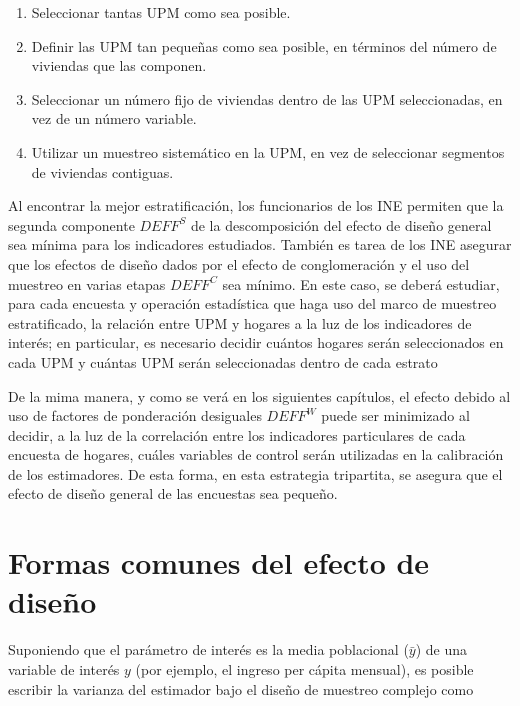 \documentclass[
  12pt,
]{book}
\providecommand{\tightlist}{%
  \setlength{\itemsep}{0pt}\setlength{\parskip}{0pt}}
\begin{document}
\begin{enumerate}
\def\labelenumi{\arabic{enumi}.}
\tightlist
\item
  Seleccionar tantas UPM como sea posible.
\item
  Definir las UPM tan pequeñas como sea posible, en términos del número de viviendas que las componen.
\item
  Seleccionar un número fijo de viviendas dentro de las UPM seleccionadas, en vez de un número variable.
\item
  Utilizar un muestreo sistemático en la UPM, en vez de seleccionar segmentos de viviendas contiguas.
\end{enumerate}

Al encontrar la mejor estratificación, los funcionarios de los INE permiten que la segunda componente \(DEFF^S\) de la descomposición del efecto de diseño general sea mínima para los indicadores estudiados. También es tarea de los INE asegurar que los efectos de diseño dados por el efecto de conglomeración y el uso del muestreo en varias etapas \(DEFF^C\) sea mínimo. En este caso, se deberá estudiar, para cada encuesta y operación estadística que haga uso del marco de muestreo estratificado, la relación entre UPM y hogares a la luz de los indicadores de interés; en particular, es necesario decidir cuántos hogares serán seleccionados en cada UPM y cuántas UPM serán seleccionadas dentro de cada estrato

De la mima manera, y como se verá en los siguientes capítulos, el efecto debido al uso de factores de ponderación desiguales \(DEFF^W\) puede ser minimizado al decidir, a la luz de la correlación entre los indicadores particulares de cada encuesta de hogares, cuáles variables de control serán utilizadas en la calibración de los estimadores. De esta forma, en esta estrategia tripartita, se asegura que el efecto de diseño general de las encuestas sea pequeño.

\hypertarget{formas-comunes-del-efecto-de-diseuxf1o}{%
\section{Formas comunes del efecto de diseño}\label{formas-comunes-del-efecto-de-diseuxf1o}}

Suponiendo que el parámetro de interés es la media poblacional (\(\bar{y}\)) de una variable de interés \(y\) (por ejemplo, el ingreso per cápita mensual), es posible escribir la varianza del estimador bajo el diseño de muestreo complejo como
\end{document}
